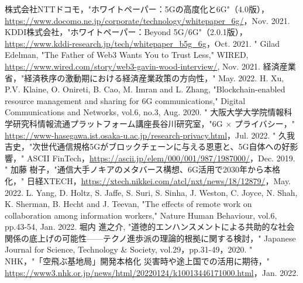 \documentclass[a4paper,10pt,uplatex]{jsarticle}
\begin{document}
\footnotesize{
  \begin{thebibliography}{99}
     株式会社NTTドコモ，"ホワイトペーパー：5Gの高度化と6G"（4.0版），\url{https://www.docomo.ne.jp/corporate/technology/whitepaper_6g/}，Nov. 2021.
     KDDI株式会社，"ホワイトペーパー：Beyond 5G/6G"（2.0.1版），\url{https://www.kddi-research.jp/tech/whitepaper_b5g_6g}，Oct. 2021.
     " Gilad Edelman, "The Father of Web3 Wants You to Trust Less," WIRED, \url{https://www.wired.com/story/web3-gavin-wood-interview/}, Nov. 2021.
     経済産業省，"経済秩序の激動期における経済産業政策の方向性，" May. 2022.
     H. Xu, P.V. Klaine, O. Onireti, B. Cao, M. Imran and L. Zhang, "Blockchain-enabled resource management and sharing for 6G communications," Digital Communications and Networks, vol.6, no.3, Aug. 2020.
     " 大阪大学大学院情報科学研究科情報流通プラットフォーム講座長谷川研究室，"6G × プライバシー，" \url{https://www-hasegawa.ist.osaka-u.ac.jp/research-privacy.html}，Jul. 2022.
     " 久我 吉史，"次世代通信規格5Gがブロックチェーンに与える恩恵と、5G自体への好影響，" ASCII FinTech，\url{https://ascii.jp/elem/000/001/987/1987000/}，Dec. 2019.
     " 加藤 樹子，"通信大手ノキアのメタバース構想、6G活用で2030年から本格化，" 日経XTECH，\url{https://xtech.nikkei.com/atcl/nxt/news/18/12879/}，May. 2022.
     L. Yang, D. Holtz, S. Jaffe, S. Suri, S. Sinha, J. Weston, C. Joyce, N. Shah, K. Sherman, B. Hecht and J. Teevan, "The effects of remote work on collaboration among information workers," Nature Human Behaviour, vol.6, pp.43-54, Jan. 2022.
     堀内 進之介, "道徳的エンハンスメントによる共助的な社会関係の底上げの可能性------テクノ進歩派の理論的根拠に関する検討，" Japanese Journal for Science, Technology \& Society, vol.29，pp.31-49，2020.
     " NHK，"「空飛ぶ基地局」開発本格化 災害時や途上国での活用に期待，" \url{https://www3.nhk.or.jp/news/html/20220124/k10013446171000.html}，Jan. 2022.
  \end{thebibliography}
}
\end{document}
